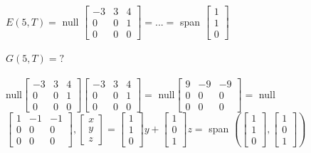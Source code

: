 \documentclass{article}
\begin{document}
$E(5,T) = $ null $\begin{bmatrix}
    -3&3&4\\0&0&1\\0&0&0
\end{bmatrix} = ... = $ span $\begin{bmatrix}
    1\\1\\0
\end{bmatrix}$\\\\
$G(5,T) = ?$\\\\
null$\begin{bmatrix}
    -3&3&4\\0&0&1\\0&0&0
\end{bmatrix}\begin{bmatrix}
    -3&3&4\\0&0&1\\0&0&0
\end{bmatrix} = $ null$\begin{bmatrix}
    9&-9&-9\\0&0&0\\0&0&0
\end{bmatrix} =$ null $\begin{bmatrix}
    1&-1&-1\\0&0&0\\0&0&0
\end{bmatrix}, \begin{bmatrix}
    x\\y\\z
\end{bmatrix} = \begin{bmatrix}
    1\\1\\0
\end{bmatrix}y + \begin{bmatrix}
    1\\0\\1
\end{bmatrix}z = $ span $(\begin{bmatrix}
    1\\1\\0
\end{bmatrix}, \begin{bmatrix}
    1\\0\\1
\end{bmatrix})$ \\\\
\end{document}
